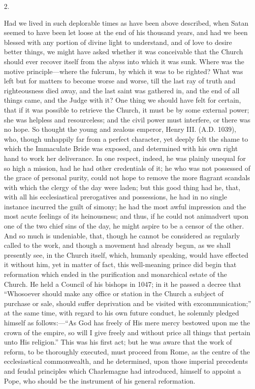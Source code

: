 2.

Had we lived in such deplorable times as have
been above described, when Satan seemed to have been let loose at the
end of his thousand years, and had we been blessed with any portion of
divine light to understand, and of love to desire better things, we
might have asked whether it was conceivable that the Church
should ever recover itself from the abyss into which it was sunk.
Where was the motive principle—where the fulcrum, by which it was to
be righted? What was left but for matters to become worse and worse,
till the last ray of truth and righteousness died away, and the last
saint was gathered in, and the end of all things came, and the Judge
with it? One thing we should have felt for certain, that if it was
possible to retrieve the Church, it must be by some external power;
she was helpless and resourceless; and the civil power must interfere,
or there was no hope. So thought the young and zealous emperor, Henry
III. (A.D. 1039), who, though
unhappily far from a perfect character, yet deeply felt the shame to
which the Immaculate Bride was exposed, and determined with his own
right hand to work her deliverance. In one respect, indeed, he was
plainly unequal for so high a mission, had he had other credentials of
it; he who was not possessed of the grace of personal purity, could
not hope to remove the more flagrant scandals with which the clergy of
the day were laden; but this good thing had he, that, with all his
ecclesiastical prerogatives and possessions, he had in no single
instance incurred the guilt of simony; he had the most awful
impression and the most acute feelings of its heinousness; and thus,
if he could not animadvert upon one of the two chief sins of the day,
he might aspire to be a censor of the other. And so much is
undeniable, that, though he cannot be considered as regularly called
to the work, and though a movement had already begun, as we shall
presently see, in the Church itself, which, humanly speaking, would
have effected it without him, yet in matter of fact, this well-meaning
prince did begin that reformation which ended in the purification and
monarchical estate of the Church. He held a Council of his
bishops in 1047; in it he passed a decree that ``Whosoever should make
any office or station in the Church a subject of purchase or sale,
should suffer deprivation and be visited with excommunication;'' at the
same time, with regard to his own future conduct, he solemnly pledged
himself as follows:—``As God has freely of His mere mercy bestowed
upon me the crown of the empire, so will I give freely and without
price all things that pertain unto His religion.'' This was his first
act; but he was aware that the work of reform, to be thoroughly
executed, must proceed from Rome, as the centre of the ecclesiastical
commonwealth, and he determined, upon those imperial precedents and
feudal principles which Charlemagne had introduced, himself to appoint
a Pope, who should be the instrument of his general reformation.

